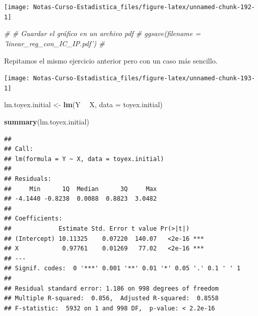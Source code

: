 \documentclass[
  12pt,
]{book}
\newenvironment{Shaded}{\begin{snugshade}}{\end{snugshade}}
\newcommand{\CommentTok}[1]{\textcolor[rgb]{0.56,0.35,0.01}{\textit{#1}}}
\newcommand{\DataTypeTok}[1]{\textcolor[rgb]{0.13,0.29,0.53}{#1}}
\newcommand{\DecValTok}[1]{\textcolor[rgb]{0.00,0.00,0.81}{#1}}
\newcommand{\KeywordTok}[1]{\textcolor[rgb]{0.13,0.29,0.53}{\textbf{#1}}}
\newcommand{\NormalTok}[1]{#1}
\newcommand{\OperatorTok}[1]{\textcolor[rgb]{0.81,0.36,0.00}{\textbf{#1}}}
\newcommand{\StringTok}[1]{\textcolor[rgb]{0.31,0.60,0.02}{#1}}
\theoremstyle{definition}
\theoremstyle{definition}
\theoremstyle{definition}
\theoremstyle{remark}
\begin{document}
\begin{center}\texttt{[image: Notas-Curso-Estadistica\_files/figure-latex/unnamed-chunk-192-1]} \end{center}

\begin{Shaded}
\begin{Highlighting}[]
\CommentTok{# # Guardar el gráfico en un archivo pdf}
\CommentTok{# ggsave(filename = 'linear_reg_con_IC_IP.pdf') #}
\end{Highlighting}
\end{Shaded}

Repitamos el mismo ejercicio anterior pero con un caso más sencillo.

\begin{Shaded}
\end{Shaded}

\begin{center}\texttt{[image: Notas-Curso-Estadistica\_files/figure-latex/unnamed-chunk-193-1]} \end{center}

\begin{Shaded}
\begin{Highlighting}[]
\NormalTok{lm.toyex.initial <-}\StringTok{ }\KeywordTok{lm}\NormalTok{(Y }\OperatorTok{~}\StringTok{ }\NormalTok{X, }\DataTypeTok{data =}\NormalTok{ toyex.initial)}

\KeywordTok{summary}\NormalTok{(lm.toyex.initial)}
\end{Highlighting}
\end{Shaded}

\begin{verbatim}
## 
## Call:
## lm(formula = Y ~ X, data = toyex.initial)
## 
## Residuals:
##     Min      1Q  Median      3Q     Max 
## -4.1440 -0.8238  0.0088  0.8823  3.0482 
## 
## Coefficients:
##             Estimate Std. Error t value Pr(>|t|)    
## (Intercept) 10.11325    0.07220  140.07   <2e-16 ***
## X            0.97761    0.01269   77.02   <2e-16 ***
## ---
## Signif. codes:  0 '***' 0.001 '**' 0.01 '*' 0.05 '.' 0.1 ' ' 1
## 
## Residual standard error: 1.186 on 998 degrees of freedom
## Multiple R-squared:  0.856,  Adjusted R-squared:  0.8558 
## F-statistic:  5932 on 1 and 998 DF,  p-value: < 2.2e-16
\end{verbatim}
\end{document}

